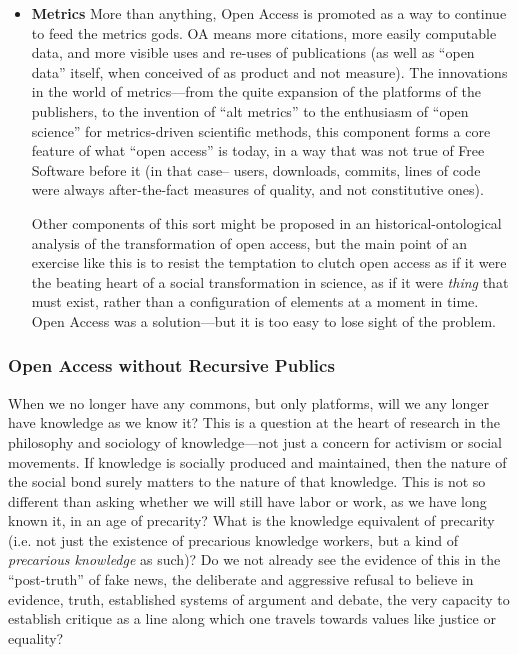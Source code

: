\documentclass[11pt]{article}
\begin{document}
\begin{itemize}
\item \textbf{Metrics}
\label{sec:org3bef2b7}
More than anything, Open Access is promoted as a way to continue to feed the metrics gods.  OA means more citations, more easily computable data, and more visible uses and re-uses of publications (as well as ``open data'' itself, when conceived of as product and not measure).  The innovations in the world of metrics---from the quite expansion of the platforms of the publishers, to the invention of ``alt metrics'' to the enthusiasm of ``open science'' for metrics-driven scientific methods, this component forms a core feature of what ``open access'' is today, in a way that was not true of Free Software before it (in that case-- users, downloads, commits, lines of code were always after-the-fact measures of quality, and not constitutive ones).  

Other components of this sort might be proposed in an historical-ontological analysis of the transformation of open access, but the main point of an exercise like this is to resist the temptation to clutch open access as if it were the beating heart of a social transformation in science, as if it were  \emph{thing} that must exist, rather than a configuration of elements at a moment in time.  Open Access was a solution---but it is too easy to lose sight of the problem.
\end{itemize}

\subsubsection*{Open Access without Recursive Publics}
\label{sec:orgfa34245}

When we no longer have any commons, but only platforms, will we any longer have knowledge as we know it?  This is a question at the heart of research in the philosophy and sociology of knowledge---not just a concern for activism or social movements.  If knowledge is socially produced and maintained, then the nature of the social bond surely matters to the nature of that knowledge.   This is not so different than asking whether we  will still have labor or work, as we have long known it, in an age of precarity?  What is the knowledge equivalent of precarity (i.e. not just the existence of precarious knowledge workers, but a kind of \emph{precarious knowledge} as such)?  Do we not already see the evidence of this in the ``post-truth'' of fake news, the deliberate and aggressive refusal to believe in evidence, truth, established systems of argument and debate, the very capacity to establish critique as a line along which one travels towards values like justice or equality?
\end{document}
